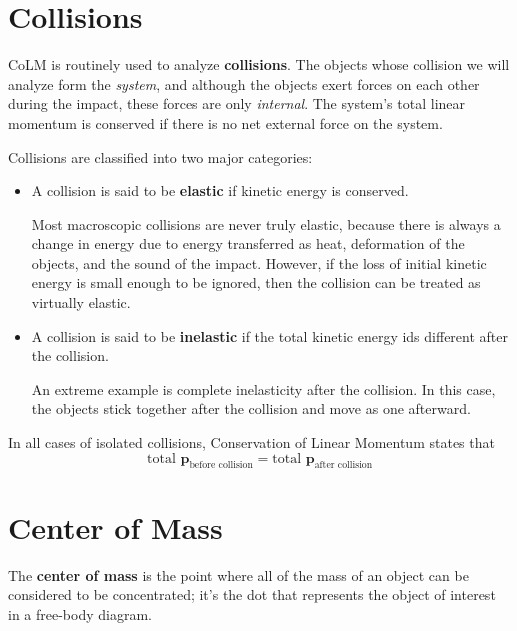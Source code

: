 \documentclass{article}
\begin{document}
\section{Collisions}
CoLM is routinely used to analyze \textbf{collisions}. The objects whose collision we will analyze form the \textit{system}, and although the objects exert forces on each other during the impact, these forces are only \textit{internal}. The system's total linear momentum is conserved if there is no net external force on the system.

Collisions are classified into two major categories:
\begin{itemize}
    \item A collision is said to be \textbf{elastic} if kinetic energy is conserved. 
    \begin{example}
        Most macroscopic collisions are never truly elastic, because there is always a change in energy due to energy transferred as heat, deformation of the objects, and the sound of the impact. However, if the loss of initial kinetic energy is small enough to be ignored, then the collision can be treated as virtually elastic.
    \end{example}
    \item A collision is said to be \textbf{inelastic} if the total kinetic energy ids different after the collision.
    \begin{example}
        An extreme example is complete inelasticity after the collision. In this case, the objects stick together after the collision and move as one afterward.
    \end{example}
\end{itemize}
In all cases of isolated collisions, Conservation of Linear Momentum states that
\begin{equation*}
    \text{total   } \textbf{p}_{\text{before collision}} = \text{total   } \textbf{p}_{\text{after collision}}
\end{equation*}

\newpage
\section{Center of Mass}
\begin{definition}
    The \textbf{center of mass} is the point where all of the mass of an object can be considered to be concentrated; it's the dot that represents the object of interest in a free-body diagram.
\end{definition}
\end{document}
